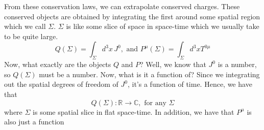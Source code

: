 From these conservation 
laws, we can extrapolate conserved charges. 
These conserved objects are obtained by 
integrating the first around some spatial region 
which we call $ \Sigma $. $ \Sigma $ is like 
some slice of space in space-time which 
we usually take to be quite large. 
\[
Q ( \Sigma )  = \int _{ \Sigma } d ^ 3 x \, J ^ 0, \text{ and } P ^ \mu ( \Sigma )  = \int _{ \Sigma } d ^ 3 x T ^{ 0 \mu } 
\] Now, what exactly are the objects $ Q $ and $ P $? 
Well, we know that $ J ^ 0 $ is a number, so $ Q ( \Sigma ) $ must 
be a number. Now, what is it a function of? Since we integrating out the spatial degrees of freedom 
of $ J ^ 0 $, it's a function of time. Hence, we have that 
\[
Q ( \Sigma ) : \mathbb{ R} \to \mathbb{ C }, \text{ for any } \Sigma 
\] where $ \Sigma $ is some spatial slice in flat space-time. 
In addition, we have that $ P ^ \mu $ is also just a function 

